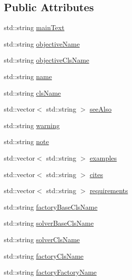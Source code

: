 \subsection*{Public Attributes}
\begin{DoxyCompactItemize}
\item 
std\+::string \hyperlink{classnifty_1_1graph_1_1optimization_1_1SolverDocstringHelper_a80179c0d46e95052f851a848dd102b37}{main\+Text}
\item 
std\+::string \hyperlink{classnifty_1_1graph_1_1optimization_1_1SolverDocstringHelper_ab80d4e0f698b2851dd4b7135a69feb03}{objective\+Name}
\item 
std\+::string \hyperlink{classnifty_1_1graph_1_1optimization_1_1SolverDocstringHelper_ae7b5b360d8e5df90688b53ad5e0c91f5}{objective\+Cls\+Name}
\item 
std\+::string \hyperlink{classnifty_1_1graph_1_1optimization_1_1SolverDocstringHelper_a5c0d1278ffa5b2b6d0ec25755d475286}{name}
\item 
std\+::string \hyperlink{classnifty_1_1graph_1_1optimization_1_1SolverDocstringHelper_a77f726127042a539d8c806dc0278203c}{cls\+Name}
\item 
std\+::vector$<$ std\+::string $>$ \hyperlink{classnifty_1_1graph_1_1optimization_1_1SolverDocstringHelper_a9418eafa1958ff7f04eee9e701db8e40}{see\+Also}
\item 
std\+::string \hyperlink{classnifty_1_1graph_1_1optimization_1_1SolverDocstringHelper_a7bfc4ddf7f8bb43184293bfe5cf04895}{warning}
\item 
std\+::string \hyperlink{classnifty_1_1graph_1_1optimization_1_1SolverDocstringHelper_a9ae95c397db0f006097af0f2e6494609}{note}
\item 
std\+::vector$<$ std\+::string $>$ \hyperlink{classnifty_1_1graph_1_1optimization_1_1SolverDocstringHelper_a7f4f5770fcd31bc828457576cde13e10}{examples}
\item 
std\+::vector$<$ std\+::string $>$ \hyperlink{classnifty_1_1graph_1_1optimization_1_1SolverDocstringHelper_ab7a93e23ee6e2d178935f3811b09fe53}{cites}
\item 
std\+::vector$<$ std\+::string $>$ \hyperlink{classnifty_1_1graph_1_1optimization_1_1SolverDocstringHelper_a4417f651373221474dab247a34f36d96}{requirements}
\item 
std\+::string \hyperlink{classnifty_1_1graph_1_1optimization_1_1SolverDocstringHelper_a20643330eb9414eeca53c6dbf3f17df3}{factory\+Base\+Cls\+Name}
\item 
std\+::string \hyperlink{classnifty_1_1graph_1_1optimization_1_1SolverDocstringHelper_a6d16acb879006a23a5db2460a2239797}{solver\+Base\+Cls\+Name}
\item 
std\+::string \hyperlink{classnifty_1_1graph_1_1optimization_1_1SolverDocstringHelper_aa177817962c27ae9382808ea82cc76b7}{solver\+Cls\+Name}
\item 
std\+::string \hyperlink{classnifty_1_1graph_1_1optimization_1_1SolverDocstringHelper_a561d4f53b345e5d899fcc711d6770631}{factory\+Cls\+Name}
\item 
std\+::string \hyperlink{classnifty_1_1graph_1_1optimization_1_1SolverDocstringHelper_a671e6895a3ef5c7e89f667293a2c58b7}{factory\+Factory\+Name}
\end{DoxyCompactItemize}


